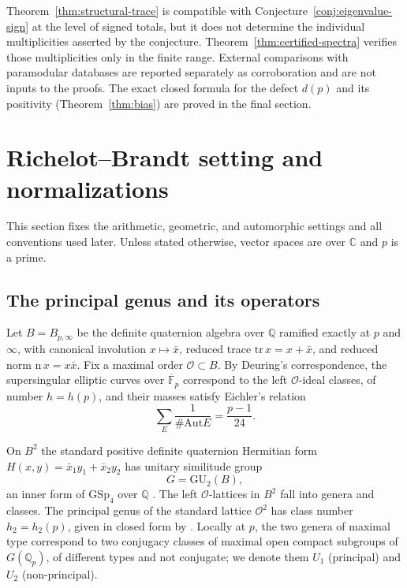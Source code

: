 \documentclass[10pt,a4paper]{amsart}
\newcommand{\Q}{\mathbb{Q}}
\newcommand{\F}{\mathbb{F}}
\newcommand{\C}{\mathbb{C}}
\newcommand{\GU}{\mathrm{GU}}
\newcommand{\GSp}{\mathrm{GSp}}
\newcommand{\Aut}{\mathrm{Aut}}
\newcommand{\Onorm}{\mathcal{O}}
\begin{document}
	Theorem~\ref{thm:structural-trace} is compatible with
	Conjecture~\ref{conj:eigenvalue-sign} at the level of signed totals, but
	it does not determine the individual multiplicities asserted by the
	conjecture. Theorem~\ref{thm:certified-spectra} verifies those
	multiplicities only in the finite range. External comparisons with
	paramodular databases are reported separately as corroboration and are not
	inputs to the proofs. The exact closed formula for the defect $d(p)$ and
	its positivity (Theorem~\ref{thm:bias}) are proved in the final section.
	
	\section{Richelot--Brandt setting and normalizations}
	\label{sec:prelim}
	
	This section fixes the arithmetic, geometric, and automorphic settings and
	all conventions used later. Unless stated otherwise, vector spaces are over
	$\C$ and $p$ is a prime.
	
	\subsection{The principal genus and its operators}
	\label{ss:principal-genus}
	
	Let $B=B_{p,\infty}$ be the definite quaternion algebra over $\Q$ ramified
	exactly at $p$ and $\infty$, with canonical involution $x\mapsto\bar x$,
	reduced trace $\mathrm{tr}\,x=x+\bar x$, and reduced norm
	$\mathrm{n}\,x=x\bar x$. Fix a maximal order $\Onorm\subset B$. By
	Deuring's correspondence, the supersingular elliptic curves over
	$\overline{\F}_p$ correspond to the left $\Onorm$-ideal classes, of number
	$h=h(p)$, and their masses satisfy Eichler's relation
	\begin{equation}\label{eq:eichler-mass}
		\sum_{E}\frac{1}{\#\Aut E}=\frac{p-1}{24}.
	\end{equation}
	
	On $B^2$ the standard positive definite quaternion Hermitian form \cite{Shimura1963}
	$H(x,y)=\bar x_1y_1+\bar x_2y_2$ has unitary similitude group
	\[
	G=\GU_2(B),
	\]
	an inner form of $\GSp_4$ over $\Q$ \cite{Ibukiyama2007compact}. The left
	$\Onorm$-lattices in $B^2$ fall into genera and classes. The principal
	genus of the standard lattice $\Onorm^2$ has class number $h_2=h_2(p)$,
	given in closed form by \cite{HashimotoIbukiyama}. Locally at $p$, the two
	genera of maximal type correspond to two conjugacy classes of maximal open
	compact subgroups of $G(\Q_p)$, of different types and not conjugate; we
	denote them $U_1$ (principal) and $U_2$ (non-principal).
	
\end{document}
